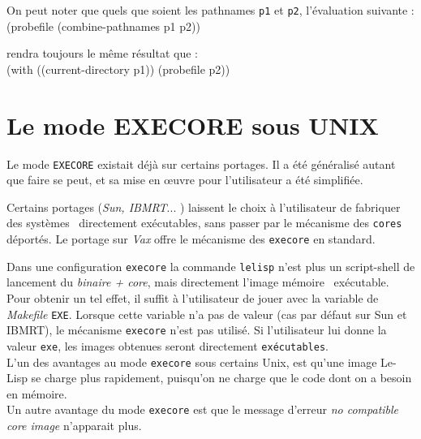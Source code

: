 On peut noter que quels que soient les pathnames {\tt p1} et {\tt p2},
l'\'{e}valuation suivante :\\ 
\? {(probefile (combine-pathnames p1 p2))}

rendra toujours le m\^{e}me r\'{e}sultat que :\\
\? {(with ((current-directory p1)) (probefile p2))}

\chapter {Le mode EXECORE sous UNIX}

Le mode {\tt EXECORE} existait d\'{e}j\`{a} sur certains portages. Il a
\'{e}t\'{e} g\'{e}n\'{e}ralis\'{e} autant que faire se peut, et sa mise en \oe uvre
pour l'utilisateur a \'{e}t\'{e} simplifi\'{e}e.

Certains portages ({\em Sun, IBMRT}... ) laissent le choix \`{a}
l'utilisateur de fabriquer des syst\`{e}mes \LeLisp\ directement
ex\'{e}cutables, sans passer par le m\'{e}canisme des {\tt cores}
d\'{e}port\'{e}s. Le portage sur {\em Vax} offre le m\'{e}canisme des {\tt execore}
en standard.

Dans une configuration {\tt execore} la commande {\tt lelisp} n'est plus un
script-shell de lancement du {\em binaire + core}, mais directement l'image
m\'{e}moire \LeLisp\ ex\'{e}cutable. \\
Pour obtenir un tel effet, il suffit \`{a}
l'utilisateur de jouer avec la variable de {\em Makefile} {\tt EXE}. Lorsque
cette variable n'a pas de valeur (cas par d\'{e}faut sur Sun et IBMRT),
le m\'{e}canisme {\tt execore} n'est pas utilis\'{e}. Si l'utilisateur
lui donne la valeur {\tt exe}, les images obtenues seront directement
{\tt ex\'{e}cutables}. \\
L'un des avantages au mode {\tt execore} sous certains Unix,
est qu'une image Le-Lisp se charge plus rapidement, puisqu'on ne
charge que le code dont on a besoin en m\'{e}moire. \\
Un autre avantage du mode {\tt execore} est que le message d'erreur
{\em no compatible core image} n'apparait plus.


